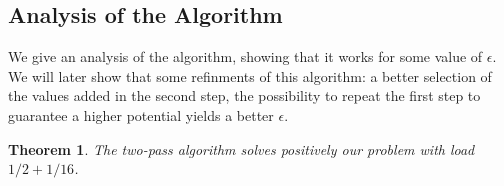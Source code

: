 \documentclass[10pt, conference, letterpaper]{IEEEtran}
\newtheorem{theorem}{Theorem}
\newtheorem{lemma}[theorem]{Lemma}
\begin{document}
% 
% 
% 
% 
% 
%  
% 


\subsection{Analysis of the Algorithm}


We give an analysis of the algorithm, showing that it works for some value
of $\epsilon$. We will later show that some refinments of this algorithm: a better selection of the 
values added in the second step, the possibility to repeat the first step to guarantee a higher potential
yields a better $\epsilon$.


\begin{theorem}
The two-pass algorithm solves positively our problem with load $1/2 + 1/16$.
\end{theorem}
\end{document}
